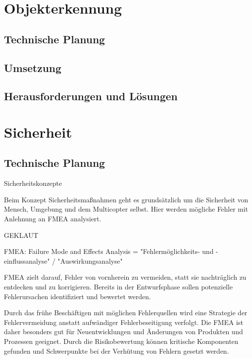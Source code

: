 \section{Objekterkennung}

  \subsection{Technische Planung}

  \subsection{Umsetzung}

  \subsection{Herausforderungen und Lösungen}

\section{Sicherheit}

  \subsection{Technische Planung}

Sicherheitskonzepte

Beim Konzept Sicherheitsmaßnahmen geht es grundsätzlich um die Sicherheit von Mensch, Umgebung und dem Multicopter selbst. Hier werden mögliche Fehler mit Anlehnung an FMEA analysiert.


GEKLAUT

FMEA: Failure Mode and Effects Analysis = "Fehlermöglichkeits- und -einflussanalyse" / "Auswirkungsanalyse"

FMEA zielt darauf, Fehler von vornherein zu vermeiden, statt sie nachträglich zu entdecken und zu korrigieren. Bereits in der Entwurfsphase sollen potenzielle Fehlerursachen identifiziert und bewertet werden.

Durch das frühe Beschäftigen mit möglichen Fehlerquellen wird eine Strategie der Fehlervermeidung anstatt aufwändiger Fehlerbeseitigung verfolgt. Die FMEA ist daher besonders gut für Neuentwicklungen und Änderungen von Produkten und Prozessen geeignet. Durch die Risikobewertung können kritische Komponenten gefunden und Schwerpunkte bei der Verhütung von Fehlern gesetzt werden.

